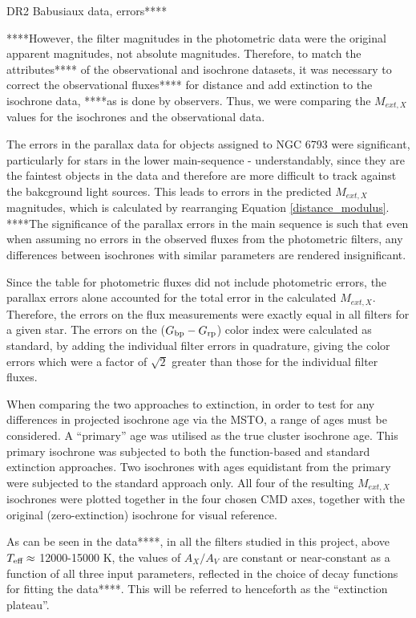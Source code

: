 \documentclass[12pt, a4paper]{report}
\begin{document}
DR2 Babusiaux data, errors****

****However, the filter magnitudes in the photometric data were the original apparent magnitudes, not absolute magnitudes. Therefore, to match the attributes**** of the observational and isochrone datasets, it was necessary to correct the observational fluxes**** for distance and add extinction to the isochrone data, ****as is done by observers. Thus, we were comparing the $M_{ext,X}$ values for the isochrones and the observational data.

The errors in the parallax data for objects assigned to NGC 6793 were significant, particularly for stars in the lower main-sequence - understandably, since they are the faintest objects in the data and therefore are more difficult to track against the bakcground light sources. This leads to errors in the predicted $M_{ext,X}$ magnitudes, which is calculated by rearranging Equation \ref{distance_modulus}. ****The significance of the parallax errors in the main sequence is such that even when assuming no errors in the observed fluxes from the photometric filters, any differences between isochrones with similar parameters are rendered insignificant.

Since the table for photometric fluxes did not include photometric errors, the parallax errors alone accounted for the total error in the calculated $M_{ext,X}$. Therefore, the errors on the flux measurements  were exactly equal in all filters for a given star. The errors on the ($G_{\textnormal{bp}}-G_{\textnormal{rp}}$) color index were calculated as standard, by adding the individual filter errors in quadrature, giving the color errors which were a factor of $\sqrt{2}$ greater than those for the individual filter fluxes.


When comparing the two approaches to extinction, in order to test for any differences in projected isochrone age via the MSTO, a range of ages must be considered. A ``primary'' age was utilised as the true cluster isochrone age. This primary isochrone was subjected to both the function-based and standard extinction approaches. Two isochrones with ages equidistant from the primary were subjected to the standard approach only. All four of the resulting $M_{ext,X}$ isochrones were plotted together in the four chosen CMD axes, together with the original (zero-extinction) isochrone for visual reference.

As can be seen in the data****, in all the filters studied in this project, above $T_{\textnormal{eff}} \approx$ 12000-15000 K, the values of $A_{X}/A_{V}$ are constant or near-constant as a function of all three input parameters, reflected in the choice of decay functions for fitting the data****. This will be referred to henceforth as the ``extinction plateau''.
\end{document}
